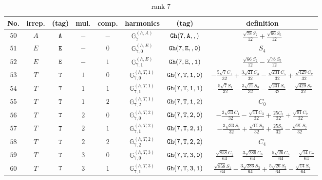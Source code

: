 \documentclass[fleqn,8pt]{jsarticle}
\begin{document}
\begin{table}[ht!]
\begin{center}
\caption{rank 7}
\renewcommand{\arraystretch}{1.3}
\begin{tabular}{cccccccc} \hline \hline
No. & irrep. & (tag) & mul. & comp. & harmonics & (tag) & definition \\ \hline
$ 50 $ & $ A $ & $ {\tt A} $ & $ - $ & $ - $ & $ \mathbb{G}_{7}^{(h,A)} $ & $ {\tt Gh(7,A,,)} $ & $ \frac{\sqrt{78} S_{2}}{12} + \frac{\sqrt{66} S_{6}}{12} $ \\
$ 51 $ & $ E $ & $ {\tt E} $ & $ - $ & $ 0 $ & $ \mathbb{G}_{7,0}^{(h,E)} $ & $ {\tt Gh(7,E,,0)} $ & $ S_{4} $ \\
$ 52 $ & $ E $ & $ {\tt E} $ & $ - $ & $ 1 $ & $ \mathbb{G}_{7,1}^{(h,E)} $ & $ {\tt Gh(7,E,,1)} $ & $ \frac{\sqrt{66} S_{2}}{12} - \frac{\sqrt{78} S_{6}}{12} $ \\
$ 53 $ & $ T $ & $ {\tt T} $ & $ 1 $ & $ 0 $ & $ \mathbb{G}_{7,0}^{(h,T,1)} $ & $ {\tt Gh(7,T,1,0)} $ & $ - \frac{5 \sqrt{7} C_{1}}{32} + \frac{3 \sqrt{21} C_{3}}{32} - \frac{\sqrt{231} C_{5}}{32} + \frac{\sqrt{429} C_{7}}{32} $ \\
$ 54 $ & $ T $ & $ {\tt T} $ & $ 1 $ & $ 1 $ & $ \mathbb{G}_{7,1}^{(h,T,1)} $ & $ {\tt Gh(7,T,1,1)} $ & $ - \frac{5 \sqrt{7} S_{1}}{32} - \frac{3 \sqrt{21} S_{3}}{32} - \frac{\sqrt{231} S_{5}}{32} - \frac{\sqrt{429} S_{7}}{32} $ \\
$ 55 $ & $ T $ & $ {\tt T} $ & $ 1 $ & $ 2 $ & $ \mathbb{G}_{7,2}^{(h,T,1)} $ & $ {\tt Gh(7,T,1,2)} $ & $ C_{0} $ \\
$ 56 $ & $ T $ & $ {\tt T} $ & $ 2 $ & $ 0 $ & $ \mathbb{G}_{7,0}^{(h,T,2)} $ & $ {\tt Gh(7,T,2,0)} $ & $ - \frac{3 \sqrt{33} C_{1}}{32} - \frac{\sqrt{11} C_{3}}{32} + \frac{25 C_{5}}{32} + \frac{\sqrt{91} C_{7}}{32} $ \\
$ 57 $ & $ T $ & $ {\tt T} $ & $ 2 $ & $ 1 $ & $ \mathbb{G}_{7,1}^{(h,T,2)} $ & $ {\tt Gh(7,T,2,1)} $ & $ - \frac{3 \sqrt{33} S_{1}}{32} + \frac{\sqrt{11} S_{3}}{32} + \frac{25 S_{5}}{32} - \frac{\sqrt{91} S_{7}}{32} $ \\
$ 58 $ & $ T $ & $ {\tt T} $ & $ 2 $ & $ 2 $ & $ \mathbb{G}_{7,2}^{(h,T,2)} $ & $ {\tt Gh(7,T,2,2)} $ & $ C_{4} $ \\
$ 59 $ & $ T $ & $ {\tt T} $ & $ 3 $ & $ 0 $ & $ \mathbb{G}_{7,0}^{(h,T,3)} $ & $ {\tt Gh(7,T,3,0)} $ & $ - \frac{\sqrt{858} C_{1}}{64} - \frac{3 \sqrt{286} C_{3}}{64} - \frac{5 \sqrt{26} C_{5}}{64} - \frac{\sqrt{14} C_{7}}{64} $ \\
$ 60 $ & $ T $ & $ {\tt T} $ & $ 3 $ & $ 1 $ & $ \mathbb{G}_{7,1}^{(h,T,3)} $ & $ {\tt Gh(7,T,3,1)} $ & $ \frac{\sqrt{858} S_{1}}{64} - \frac{3 \sqrt{286} S_{3}}{64} + \frac{5 \sqrt{26} S_{5}}{64} - \frac{\sqrt{14} S_{7}}{64} $ \\

\end{tabular}
\end{center}
\end{table}
\end{document}
